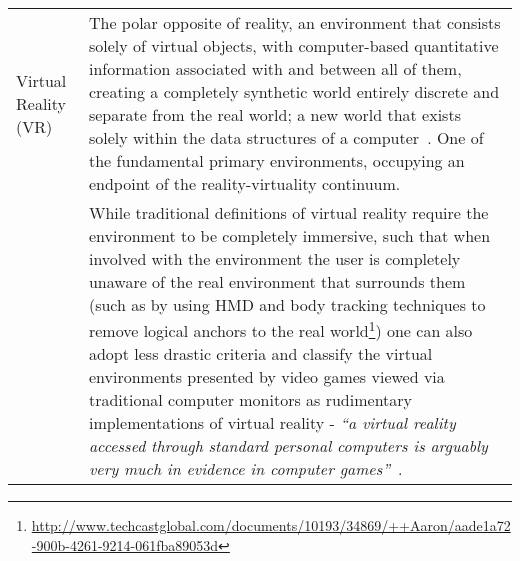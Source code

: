 \begin{center}
\begin{longtable}{ l p{10cm} }




Virtual Reality (VR) & The polar opposite of reality, an environment that consists solely of virtual objects, with computer-based quantitative information associated with and between all of them, creating a completely synthetic world entirely discrete and separate from the real world; a new world that exists solely within the data structures of a computer~\cite{Milgram1999, Want2009}. One of the fundamental primary environments, occupying an endpoint of the reality-virtuality continuum. \\

 & While traditional definitions of virtual reality require the environment to be completely immersive, such that when involved with the environment the user is completely unaware of the real environment that surrounds them (such as by using HMD and body tracking techniques to remove logical anchors to the real world\footnote{\url{http://www.techcastglobal.com/documents/10193/34869/++Aaron/aade1a72-900b-4261-9214-061fba89053d}}) one can also adopt less drastic criteria and classify the virtual environments presented by video games viewed via traditional computer monitors as rudimentary implementations of virtual reality - \textit{``a virtual reality accessed through standard personal computers is arguably very much in evidence in computer games''}~\cite{Green2014}. \\
		
\midrule



		


\end{longtable}
\end{center}

